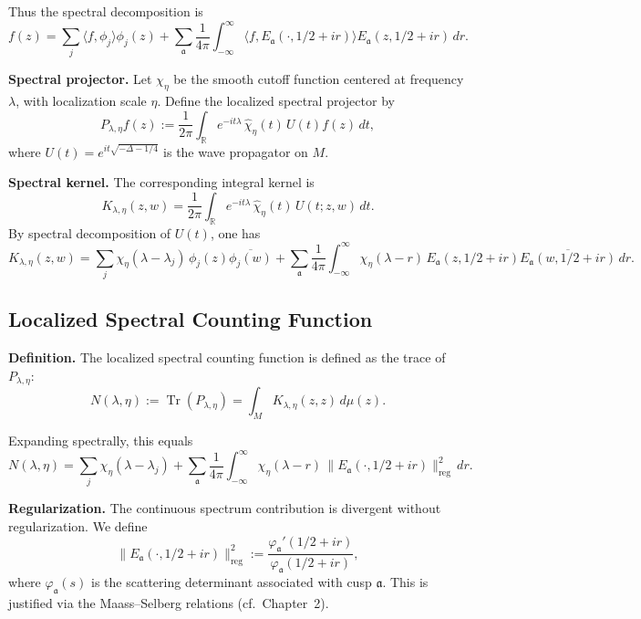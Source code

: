 Thus the spectral decomposition is
\[
  f(z) = \sum_{j} \langle f, \phi_j \rangle \phi_j(z)
  + \sum_{\mathfrak{a}} \frac{1}{4\pi} \int_{-\infty}^{\infty}
    \langle f, E_\mathfrak{a}(\cdot,1/2+ir) \rangle
    E_\mathfrak{a}(z,1/2+ir)\, dr.
\]

\medskip

\noindent\textbf{Spectral projector.}
Let $\chi_\eta$ be the smooth cutoff function centered at frequency $\lambda$, with localization scale $\eta$.  
Define the localized spectral projector by
\[
  P_{\lambda,\eta} f(z)
  := \frac{1}{2\pi} \int_{\mathbb{R}} e^{-it\lambda}\, \widehat{\chi}_\eta(t)\, U(t)f(z)\, dt,
\]
where $U(t) = e^{it\sqrt{-\Delta-1/4}}$ is the wave propagator on $M$.  

\medskip

\noindent\textbf{Spectral kernel.}
The corresponding integral kernel is
\[
  K_{\lambda,\eta}(z,w)
  = \frac{1}{2\pi} \int_{\mathbb{R}} e^{-it\lambda}\,\widehat{\chi}_\eta(t)\, U(t;z,w)\, dt.
\]
By spectral decomposition of $U(t)$, one has
\[
  K_{\lambda,\eta}(z,w)
  = \sum_j \chi_\eta(\lambda-\lambda_j)\, \phi_j(z)\overline{\phi_j(w)}
  + \sum_\mathfrak{a} \frac{1}{4\pi}\int_{-\infty}^\infty
    \chi_\eta(\lambda-r)\,
    E_\mathfrak{a}(z,1/2+ir)\overline{E_\mathfrak{a}(w,1/2+ir)}\, dr.
\]

\subsection{Localized Spectral Counting Function}

\noindent\textbf{Definition.}
The localized spectral counting function is defined as the trace of $P_{\lambda,\eta}$:
\[
  N(\lambda,\eta) := \operatorname{Tr}(P_{\lambda,\eta})
  = \int_M K_{\lambda,\eta}(z,z)\, d\mu(z).
\]

\noindent Expanding spectrally, this equals
\[
  N(\lambda,\eta)
  = \sum_j \chi_\eta(\lambda-\lambda_j)
  + \sum_\mathfrak{a} \frac{1}{4\pi}\int_{-\infty}^\infty
    \chi_\eta(\lambda-r)\,
    \|E_\mathfrak{a}(\cdot,1/2+ir)\|^2_{\mathrm{reg}}\, dr.
\]

\medskip

\noindent\textbf{Regularization.}
The continuous spectrum contribution is divergent without regularization.  
We define
\[
  \|E_\mathfrak{a}(\cdot,1/2+ir)\|^2_{\mathrm{reg}}
  := \frac{\varphi_\mathfrak{a}'(1/2+ir)}{\varphi_\mathfrak{a}(1/2+ir)},
\]
where $\varphi_\mathfrak{a}(s)$ is the scattering determinant associated with cusp $\mathfrak{a}$.
This is justified via the Maass–Selberg relations (cf.\ Chapter~2).

